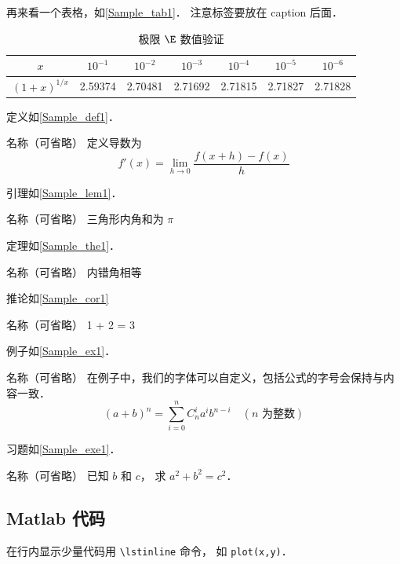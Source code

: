 再来看一个表格，如\autoref{Sample_tab1}． 注意标签要放在 caption 后面．
\begin{table}[ht]
\centering
\caption{极限 $\E$ 数值验证}\label{Sample_tab1}
\begin{tabular}{|c|c|c|c|c|c|c|}
\hline
$x$ & ${10^{ - 1}}$ & ${10^{ - 2}}$ & ${10^{ - 3}}$ & ${10^{ - 4}}$ & ${10^{ - 5}}$ & ${10^{ - 6}}$ \\
\hline
$(1 + x)^{1/x}$ & 2.59374 & 2.70481 & 2.71692 & 2.71815 & 2.71827 & 2.71828 \\
\hline
\end{tabular}
\end{table}

定义如\autoref{Sample_def1}．
\begin{definition}{名称（可省略）}\label{Sample_def1}
 定义导数为
\begin{equation}
f'(x) = \lim_{h \to 0} \frac{f(x + h) - f(x)}{h}
\end{equation}
\end{definition}

引理如\autoref{Sample_lem1}．
\begin{lemma}{名称（可省略）}\label{Sample_lem1}
三角形内角和为 $\pi$
\end{lemma}

定理如\autoref{Sample_the1}．
\begin{theorem}{名称（可省略）}\label{Sample_the1}
内错角相等
\end{theorem}

推论如\autoref{Sample_cor1}
\begin{corollary}{名称（可省略）}\label{Sample_cor1}
1 + 2 = 3
\end{corollary}

例子如\autoref{Sample_ex1}． 
\begin{example}{名称（可省略）}\label{Sample_ex1}
在例子中，我们的字体可以自定义，包括公式的字号会保持与内容一致．
\begin{equation}
(a+b)^n = \sum_{i=0}^n C_n^i a^i b^{n-i} \quad (\text{$n$ 为整数})
\end{equation}
\end{example}

习题如\autoref{Sample_exe1}． 
\begin{exercise}{名称（可省略）}\label{Sample_exe1}
已知 $b$ 和 $c$， 求 $a^2 + b^2 = c^2$．
\end{exercise}

\subsection{Matlab 代码}
在行内显示少量代码用 \lstinline|\lstinline| 命令， 如 \lstinline|plot(x,y)|．
